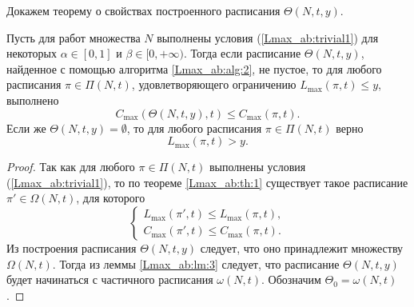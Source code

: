Докажем теорему о свойствах построенного расписания $\Theta(N,t,y)$.
\begin{theorem} \label{Lmax_ab:th:2}
Пусть для работ множества $N$ выполнены условия (\ref{Lmax_ab:trivial1}) для некоторых $\alpha \in [0,1]$ и $\beta \in [0, +\infty)$. Тогда если расписание $\Theta(N, t, y)$, найденное с помощью алгоритма \ref{Lmax_ab:alg:2}, не пустое, то для любого расписания $\pi \in \Pi(N,t)$, удовлетворяющего ограничению $L_{\max}(\pi,t) \leq y$, выполнено
$$C_{\max}(\Theta(N,t,y),t) \leq C_{\max}(\pi,t).$$
Если же $\Theta(N, t, y) = \emptyset$, то для любого расписания $\pi \in \Pi(N,t)$ верно
$$L_{\max}(\pi,t) > y.$$
\end{theorem}
\begin{proof}
Так как для любого $\pi \in \Pi(N,t)$ выполнены условия (\ref{Lmax_ab:trivial1}), то по теореме \ref{Lmax_ab:th:1} существует такое расписание $\pi' \in \Omega(N, t)$, для которого
\begin{equation*}
    \begin{cases}
        L_{\max}(\pi ', t) \leq L_{\max} (\pi, t),\\
        C_{\max}(\pi ', t) \leq C_{\max} (\pi, t).
    \end{cases}
\end{equation*}
Из построения расписания $\Theta(N,t,y)$ следует, что оно принадлежит множеству $\Omega(N, t)$. Тогда из леммы \ref{Lmax_ab:lm:3} следует, что расписание $\Theta(N,t,y)$ будет начинаться с частичного расписания $\omega(N, t)$. Обозначим $\Theta_0 = \omega(N, t)$.


\end{proof}
